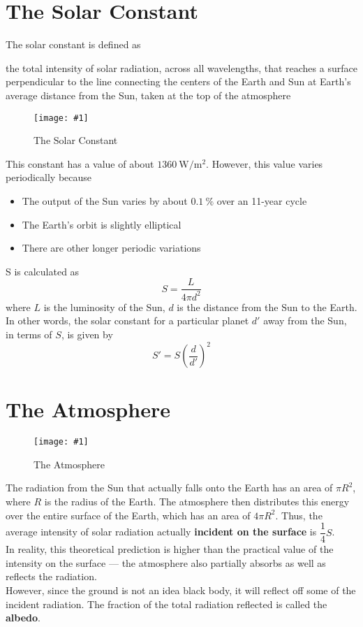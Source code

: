 \documentclass[a4paper,12pt]{article}
\let\oldsection\section
\renewcommand\section{\clearpage\oldsection}
\newcommand{\lb}{\\[8pt]}
\newcommand{\img}[4]{\begin{center}
  \begin{figure}[H]
    \centering
    \texttt{[image: \#1]}
    \caption{#3}
    \label{fig:#4}
  \end{figure}
\end{center}}
\newcommand{\paren}[1]{\left(#1\right)}
\begin{document}
\section{The Solar Constant}

The solar constant is defined as

\begin{center}
  the total intensity of solar radiation, across all wavelengths, that reaches a surface perpendicular to the line connecting the centers of the Earth and Sun at Earth's average distance from the Sun, taken at the top of the atmosphere
\end{center}

\img{solar-constant.jpg}{1}{The Solar Constant}{solar-constant}

This constant has a value of about $\SI{1360}{\watt\per\meter\squared}$. However, this value varies periodically because
\begin{itemize}
  \item The output of the Sun varies by about $\SI{0.1}{\percent}$ over an 11-year cycle
  \item The Earth's orbit is slightly elliptical
  \item There are other longer periodic variations
\end{itemize}

S is calculated as
$$S = \frac{L}{4\pi d^2}$$
where $L$ is the luminosity of the Sun, $d$ is the distance from the Sun to the Earth. In other words, the solar constant for a particular planet $d'$ away from the Sun, in terms of $S$, is given by
$$S' = S \paren{\frac{d}{d'}}^2$$

\section{The Atmosphere}

\img{atm_rad.png}{0.5}{The Atmosphere}{atm-rad}

The radiation from the Sun that actually falls onto the Earth has an area of $\pi R^2$, where $R$ is the radius of the Earth. The atmosphere then distributes this energy over the entire surface of the Earth, which has an area of $4\pi R^2$. Thus, the average intensity of solar radiation actually \textbf{incident on the surface} is $\dfrac{1}{4}S$.\lb
In reality, this theoretical prediction is higher than the practical value of the intensity on the surface --- the atmosphere also partially absorbs as well as reflects the radiation.\lb
However, since the ground is not an idea black body, it will reflect off some of the incident radiation. The fraction of the total radiation reflected is called the \textbf{albedo}.
\end{document}
